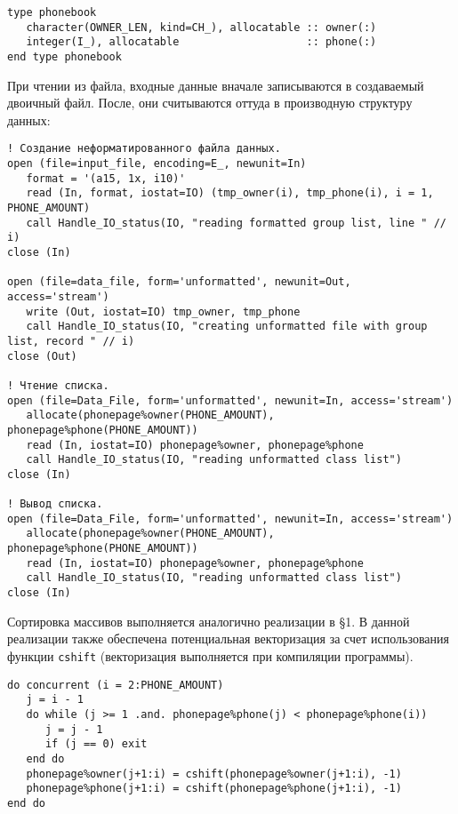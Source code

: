 \documentclass[a4paper,14pt]{article}
\begin{document}
\begin{lstlisting}[caption={Структура массивов фамилий и номеров телефонов}]
type phonebook
   character(OWNER_LEN, kind=CH_), allocatable :: owner(:)
   integer(I_), allocatable                    :: phone(:)
end type phonebook
\end{lstlisting}

При чтении из файла, входные данные вначале записываются в создаваемый двоичный файл. После, они считываются оттуда в производную структуру данных:

\begin{lstlisting}[caption={Ввод и вывод данных. Создание двоичного файла}, label={lst:array_io}]
! Создание неформатированного файла данных.
open (file=input_file, encoding=E_, newunit=In)
   format = '(a15, 1x, i10)'
   read (In, format, iostat=IO) (tmp_owner(i), tmp_phone(i), i = 1, PHONE_AMOUNT)
   call Handle_IO_status(IO, "reading formatted group list, line " // i)
close (In)

open (file=data_file, form='unformatted', newunit=Out, access='stream')               
   write (Out, iostat=IO) tmp_owner, tmp_phone
   call Handle_IO_status(IO, "creating unformatted file with group list, record " // i)
close (Out)

! Чтение списка.
open (file=Data_File, form='unformatted', newunit=In, access='stream')
   allocate(phonepage%owner(PHONE_AMOUNT), phonepage%phone(PHONE_AMOUNT))
   read (In, iostat=IO) phonepage%owner, phonepage%phone
   call Handle_IO_status(IO, "reading unformatted class list")
close (In)
 
! Вывод списка.
open (file=Data_File, form='unformatted', newunit=In, access='stream')
   allocate(phonepage%owner(PHONE_AMOUNT), phonepage%phone(PHONE_AMOUNT))
   read (In, iostat=IO) phonepage%owner, phonepage%phone
   call Handle_IO_status(IO, "reading unformatted class list")
close (In)
\end{lstlisting}

Сортировка массивов выполняется аналогично реализации в §1. В данной реализации также обеспечена потенциальная векторизация за счет использования функции \texttt{cshift} (векторизация выполняется при компиляции программы).  

\begin{lstlisting}[caption={Сортировка структуры массивов}]
do concurrent (i = 2:PHONE_AMOUNT)
   j = i - 1
   do while (j >= 1 .and. phonepage%phone(j) < phonepage%phone(i))
      j = j - 1
      if (j == 0) exit
   end do
   phonepage%owner(j+1:i) = cshift(phonepage%owner(j+1:i), -1)
   phonepage%phone(j+1:i) = cshift(phonepage%phone(j+1:i), -1)
end do
\end{lstlisting}
\end{document}
